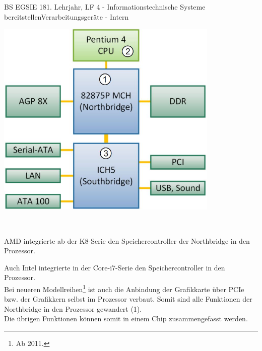 \documentclass[oneside,openany,headings=optiontotoc,11pt,numbers=noenddot]{article}
\begin{document}
\begin{worksheet}{BS EGSIE 18}{1. Lehrjahr, LF 4 - Informationstechnische Systeme bereitstellen}{Verarbeitungsgeräte - Intern}
\begin{minipage}[l]{0.48\textwidth}
		\end{minipage}
		\hfill
		\begin{minipage}[c]{0.48\textwidth}
			\includegraphics[width=0.8\textwidth]{../99_Bilder/ChP4.jpg}
		\end{minipage}\\
		\par\noindent
		AMD integrierte ab der K8-Serie den Speichercontroller der Northbridge in den Prozessor.\\
		\par\noindent
		\begin{minipage}[l]{0.48\textwidth}
			Auch Intel integrierte in der Core-i7-Serie den Speichercontroller in den Prozessor.\\
			Bei neueren Modellreihen\footnote{Ab 2011.} ist auch die Anbindung der Grafikkarte über PCIe bzw. der Grafikkern selbst im Prozessor verbaut. Somit sind alle Funktionen der Northbridge in den Prozessor gewandert (1).\\
			Die übrigen Funktionen können somit in einem Chip zusammengefasst werden.
		\end{minipage}
		\hfill
		\begin{minipage}[c]{0.48\textwidth}

\end{minipage}
\end{worksheet}
\end{document}
